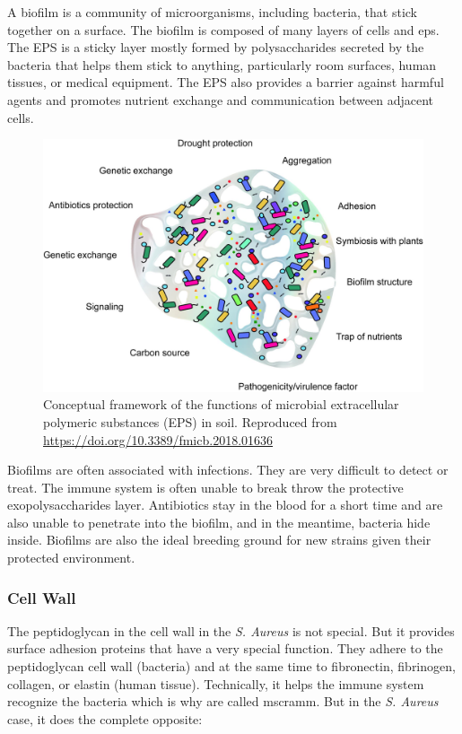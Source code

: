 
A biofilm is a community of microorganisms, including bacteria, that stick together on a surface. The biofilm is composed of many layers of cells and \gls{eps}. The EPS is a sticky layer mostly formed by polysaccharides secreted by the bacteria that helps them stick to anything, particularly room surfaces, human tissues, or medical equipment. The EPS also provides a barrier against harmful agents and promotes nutrient exchange and communication between adjacent cells.

    \begin{figure}[h!]
        \centering
            \includegraphics[width=0.7\linewidth]{figures/Staph/fmicb-09-01636-g001.jpg } 
        \caption{Conceptual framework of the functions of microbial extracellular polymeric substances (EPS) in soil. Reproduced from \url{https://doi.org/10.3389/fmicb.2018.01636}}
        \label{figure:EPS}
    \end{figure}

Biofilms are often associated with infections. They are very difficult to detect or treat. The immune system is often unable to break throw the protective exopolysaccharides layer. Antibiotics stay in the blood for a short time and are also unable to penetrate into the biofilm, and in the meantime, bacteria hide inside. Biofilms are also the ideal breeding ground for new strains given their protected environment.

\subsubsection{Cell Wall}

The peptidoglycan in the cell wall in the \textit{S. Aureus} is not special. But it provides surface adhesion proteins that have a very special function. They adhere to the peptidoglycan cell wall (bacteria) and at the same time to fibronectin, fibrinogen, collagen, or elastin (human tissue). Technically, it helps the immune system recognize the bacteria which is why are called \gls{mscramm}. But in the \textit{S. Aureus} case, it does the complete opposite:

